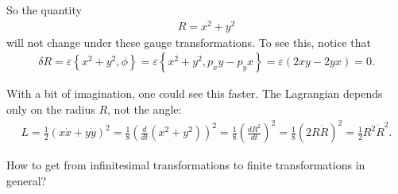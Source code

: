 So the quantity 
\begin{align}
R = x^2 + y^2 
\end{align}
will not change under these gauge transformations. To see this, notice that
\begin{align}
\delta R = \varepsilon \left \{ x^2 + y^2 , \phi \right \} = \varepsilon \left \{ x^2 + y^2 , p_x y - p_y x \right \} = \varepsilon (2xy - 2yx) = 0.
\end{align}

With a bit of imagination, one could see this faster. The Lagrangian depends only on the radius $R$, not the angle:
\begin{align}
L = \frac{1}{2} (x \dot{x} + y \dot{y})^2 = \frac{1}{8} \left( \frac{d}{dt} (x^2 + y^2) \right)^2 = \frac{1}{8} \left( \frac{d R^2}{dt} \right)^2 = \frac{1}{8} (2 R \dot{R})^2 = \frac{1}{2} R^2 \dot{R}^2.
\end{align}

\label{sec:finite_gauge_transformations}
How to get from infinitesimal transformations to finite transformations in general? \\

